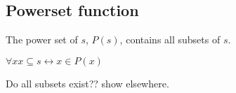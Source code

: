 
\subsection{Powerset function}

The power set of \(s\), \(P(s)\), contains all subsets of \(s\).

\(\forall x x\subseteq s \leftrightarrow x\in P(x)\)

Do all subsets exist?? show elsewhere.

